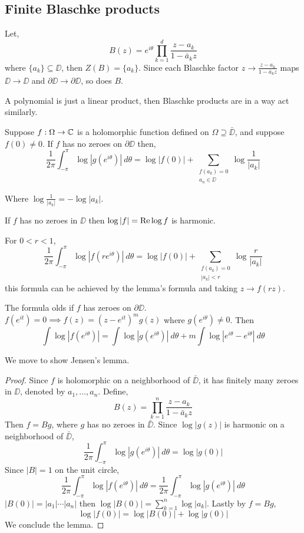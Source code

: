 \subsection{Finite Blaschke products}
Let,
\[
	B(z)
	= e^{i \theta} \prod_{k = 1}^d \frac{z - a_k}{1 - \bar{a}_k z}
\]
where $\{ a_k \} \subseteq \DD$, then $Z(B) = \{ a_k \}$.
Since each Blaschke factor $z \to \frac{z - a_k}{1 - \bar{a}_k z}$ maps $\DD \to \DD$ and $\partial \DD \to \partial \DD$, so does $B$.
\begin{remark}
	A polynomial is just a linear product, then Blaschke products are in a way act similarly.
\end{remark}
\begin{lemma}[Jensen's]
	Suppose $f : \Omega \to \mathbb{C}$ is a holomorphic function defined on $\Omega \supseteq \bar{\DD}$, and suppose $f(0) \ne 0$.
	If $f$ has no zeroes on $\partial \DD$ then,
	\[
		\frac{1}{2 \pi} \int_{-\pi}^{\pi} \log |g(e^{i \theta})|\ d \theta
		= \log |f(0)| + \sum_{\substack{f(a_k) = 0 \\ a_n \in \DD}} \log \frac{1}{|a_k|}
	\]
\end{lemma}
Where $\log \frac{1}{|a_k|} = - \log |a_k|$.
\begin{remark}
	If $f$ has no zeroes in $\DD$ then $\log |f| = \operatorname{Re} \log f$ is harmonic.
\end{remark}
\begin{remark}
	For $0 < r < 1$,
	\[
		\frac{1}{2 \pi} \int_{-\pi}^{\pi} \log |f(r e^{i \theta})|\ d \theta
		= \log |f(0)| + \sum_{\substack{f(a_k) = 0 \\ |a_k| < r}} \log \frac{r}{|a_k|}
	\]
	this formula can be achieved by the lemma's formula and taking $z \to f(r z)$.
\end{remark}
\begin{remark}
	The formula olds if $f$ has zeroes on $\partial \DD$.
	$f(e^{i t}) = 0 \implies f(z) = {(z - e^{i t})}^m g(z)$ where $g(e^{i \theta}) \ne 0$.
	Then
	\[
		\int \log |f(e^{i \theta})|
		= \int \log |g(e^{i \theta})|\ d \theta + m \int \log |e^{i \theta} - e^{i \theta}|\ d \theta
	\]
\end{remark}
We move to show Jensen's lemma.
\begin{proof}
	Since $f$ is holomorphic on a neighborhood of $\bar{\DD}$, it has finitely many zeroes in $\DD$, denoted by $a_1, \ldots, a_n$.
	Define,
	\[
		B(z)
		= \prod_{k = 1}^n \frac{z - a_k}{1 - \bar{a}_k z}
	\]
	Then $f = B g$, where $g$ has no zeroes in $\bar{\DD}$.
	Since $\log |g(z)|$ is harmonic on a neighborhood of $\bar{\DD}$,
	\[
		\frac{1}{2 \pi} \int_{-\pi}^{\pi} \log |g(e^{i \theta})|\ d \theta
		= \log |g(0)|
	\]
	Since $|B| = 1$ on the unit circle,
	\[
		\frac{1}{2 \pi} \int_{-\pi}^{\pi} \log |f(e^{i \theta})|\ d \theta
		= \frac{1}{2 \pi} \int_{-\pi}^{\pi} \log |g(e^{i \theta})|\ d \theta
	\]
	$|B(0)| = |a_1| \cdots |a_n|$ then $\log |B(0)| = \sum_{k = 1}^n \log |a_k|$.
	Lastly by $f = B g$,
	\[
		\log |f(0)|
		= \log |B(0)| + \log |g(0)|
	\]
	We conclude the lemma.
\end{proof}
